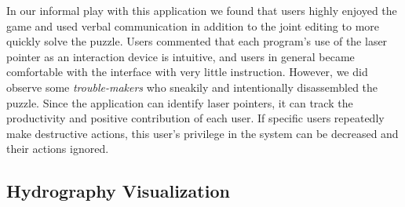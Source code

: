 \documentclass[review]{vgtc}                 %
\begin{document}
In our informal play with this application we found that users highly
enjoyed the game and used verbal communication in addition to the
joint editing to more quickly solve the puzzle.  Users commented that
each program's use of the laser pointer as an interaction device is
intuitive, and users in general became comfortable with the interface
with very little instruction.  However, we did observe some {\em
  trouble-makers} who sneakily and intentionally disassembled the
puzzle.  Since the application can identify laser pointers, it can
track the productivity and positive contribution of each user.
If specific users repeatedly make destructive actions, this user's
privilege in the system can be decreased and their actions ignored.
%


\subsection{Hydrography Visualization}
\end{document}
